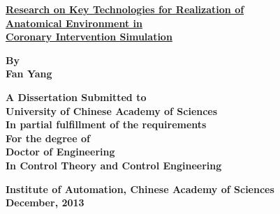 
{\renewcommand{\baselinestretch}{1.0}

\thispagestyle{empty} %

\vspace*{0.5cm} %
\begin{center}
  {\xiaoerhao \hei \textsf{\textbf{\underline{Research on Key Technologies for Realization of}\\
  \underline{Anatomical Environment in}\\
  \underline{Coronary Intervention Simulation}
  }}}
\end{center}

\vspace*{3.5cm} %
\begin{center}

\textsf{\sanhao \textrm{\textbf{By}}}\\
\textsf{\sanhao \textrm{\textbf{Fan Yang}}}

\vspace*{2.0cm} %
\xiaosihao \textrm{\textbf{ A Dissertation Submitted to\\
University of Chinese Academy of Sciences\\
In partial fulfillment of the requirements\\
For the degree of\\
Doctor of Engineering\\
In Control Theory and Control Engineering}}
\end{center}

\begin{center}
\vspace{1.5cm}
\xiaosihao \textrm{\textbf{Institute of Automation, Chinese Academy of Sciences}}\\
\wuhao \textrm{\textbf{December, 2013}}
\end{center}
} 